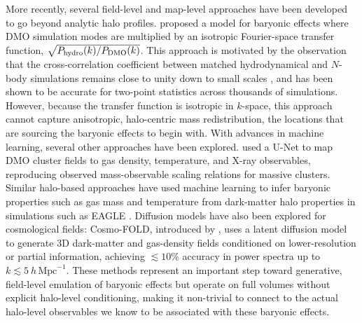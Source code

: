 \documentclass[linenumbers,trackchanges, twocolumn]{aastex701}
\begin{document}
More recently, several field-level and map-level approaches have been developed to go beyond analytic halo profiles. \citet{Sharma-2024} proposed a model for baryonic effects where DMO simulation modes are multiplied by an isotropic Fourier-space transfer function, $\sqrt{P_{\rm hydro}(k)/P_{\rm DMO}(k)}$. This approach is motivated by the observation that the cross-correlation coefficient between matched hydrodynamical and $N$-body simulations remains close to unity down to small scales \citep{Sharma-2024}, and has been shown to be accurate for two-point statistics across thousands of simulations. However, because the transfer function is isotropic in $k$-space, this approach cannot capture anisotropic, halo-centric mass redistribution, the locations that are sourcing the baryonic effects to begin with. With advances in machine learning, several other approaches have been explored. \citet{Chadayammuri-2023} used a U-Net to map DMO cluster fields to gas density, temperature, and X-ray observables, reproducing observed mass-observable scaling relations for massive clusters. Similar halo-based approaches have used machine learning to infer baryonic properties such as gas mass and temperature from dark-matter halo properties in simulations such as EAGLE \citep[e.g.][]{Moews-2021}. Diffusion models have also been explored for cosmological fields: Cosmo-FOLD, introduced by \citet{Mishra-2026}, uses a latent diffusion model to generate 3D dark-matter and gas-density fields conditioned on lower-resolution or partial information, achieving $\lesssim 10\%$ accuracy in power spectra up to $k \lesssim 5~h\,\mathrm{Mpc}^{-1}$. These methods represent an important step toward generative, field-level emulation of baryonic effects but operate on full volumes without explicit halo-level conditioning, making it non-trivial to connect to the actual halo-level observables we know to be associated with these baryonic effects.
\end{document}
